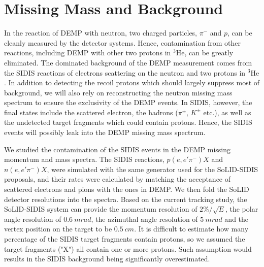 \section{Missing Mass and Background}
In the reaction of DEMP with neutron, two charged particles, $\pi^{-}$ and $p$, can be cleanly measured by the detector systems. Hence, contamination from other reactions, including DEMP with other two protons in $\mathrm{^{3}He}$, can be greatly eliminated. The dominated background of the DEMP measurement comes from the SIDIS reactions of electrons scattering on the neutron and two protons in $\mathrm{^{3}He}$. In addition to detecting the recoil protons which should largely suppress most of background, we will also rely on reconstructing the neutron missing mass spectrum to ensure the exclusivity of the DEMP events. In SIDIS, however, the final states include the scattered electron, the hadrons ($\pi^{\pm}$, $K^{\pm}$ etc.), as well as the undetected target fragments which could contain protons. Hence, the SIDIS events will possibly leak into the DEMP missing mass spectrum.

We studied the contamination of the SIDIS events in the DEMP missing momentum and mass spectra. The SIDIS reactions, $p(e,e'\pi^{-})X$ and $n(e,e'\pi^{-})X$,  were simulated with the same generator used for the SoLID-SIDIS proposals, and their rates were calculated by matching the acceptance of scattered electrons and pions with the ones in DEMP. We then fold the SoLID detector resolutions into the spectra. Based on the current tracking study, the SoLID-SIDIS system can provide the momentum resolution of $2\%/\sqrt{E}$, the polar angle resolution of  $0.6~mrad$, the azimuthal angle resolution of $5~mrad$ and the vertex position on the target to be $0.5~cm$. It is difficult to estimate how many percentage of the SIDIS target fragments contain protons, so we assumed the target fragments ("X") all contain one or more protons. Such assumption would results in the SIDIS background being significantly overestimated. 

